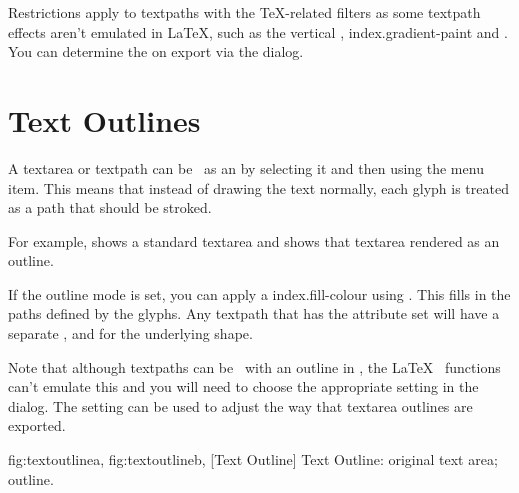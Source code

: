 \begin{warning}
Restrictions apply to \glspl*{textpath} with the
 \TeX-related filters as some \gls*{textpath}
effects aren't emulated in \LaTeX, such as the vertical ,
\gls{index.gradient-paint} and . You can determine 
the  on export via the  dialog.
\end{warning}


\section{Text Outlines}\label{sec:textoutline}


A \gls{textarea} or \gls{textpath} can be \rendered\ as an
 by
selecting it and then using the 
menu item. This means that instead of drawing the text normally,
each glyph is treated as a path that should be stroked.

For example,  shows a
standard \gls*{textarea} and  shows
that \gls*{textarea} rendered as an outline.

If the outline mode is set, you can apply a \gls{index.fill-colour} using
. This fills in the paths defined by
the glyphs. Any \gls{textpath} that has the 
attribute set will have a separate , 
and  for the underlying shape.

\begin{warning}
Note that although \glspl*{textpath} can be \rendered\ with an outline in \FlowframTk,
the \LaTeX\  functions can't emulate
this and you will need to choose the appropriate 
setting in the  dialog.
The  setting can be used to adjust
the way that \gls{textarea} outlines are exported.
\end{warning}

{
 {fig:textoutlinea}{}{},
 {fig:textoutlineb}{}{},
}
[Text Outline]
{Text Outline:  original text area;
   outline.}

